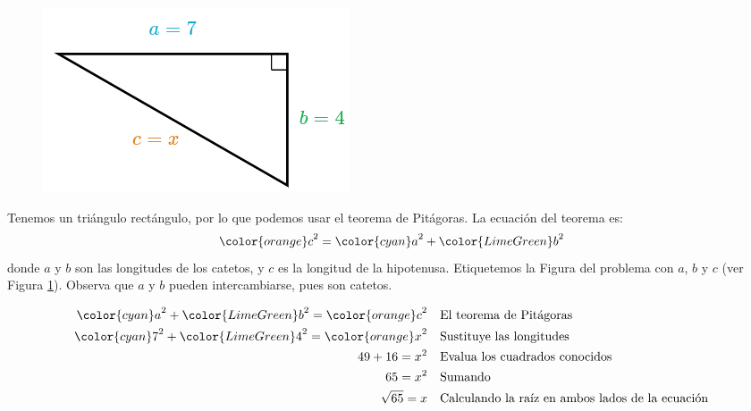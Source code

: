 \begin{minipage}[t][][t]{0.6\textwidth}
    \begin{solutionbox}{9cm}
        \begin{minipage}{0.4\textwidth}
            \begin{figure}[H]
                \centering
                \includegraphics[width=0.9\linewidth]{../images/lados_pitagoras_20a.png}
                \caption{}
                \label{fig:lados_pitagoras_20a}
            \end{figure}
        \end{minipage}\hfill
        \begin{minipage}{0.55\textwidth}
            Tenemos un triángulo rectángulo, por lo que podemos usar el teorema de Pitágoras.
            La ecuación del teorema es:
            \[{\color{orange}c}^2={\color{cyan}a}^2+{\color{LimeGreen}b}^2\]
            donde $a$ y $b$ son las longitudes de los catetos, y $c$ es la longitud de la hipotenusa.
            Etiquetemos la Figura del problema con $a$, $b$ y $c$ (ver Figura \ref{fig:lados_pitagoras_20a}).
            Observa que $a$ y $b$ pueden intercambiarse, pues son catetos.
        \end{minipage}
        \begin{align*}
            {\color{cyan}a}^2+{\color{LimeGreen}b}^2  ={\color{orange}c}^2 & \text{\quad El teorema de Pitágoras}                          \\
            {\color{cyan}7}^2+{\color{LimeGreen}4}^2  ={\color{orange}x}^2 & \text{\quad Sustituye las longitudes}                         \\
            49+16   =x^2                                                   & \text{\quad Evalua los cuadrados conocidos}                   \\
            65=x^2                                                         & \text{\quad Sumando }                                         \\
            \sqrt{65}=x                                                    & \text{\quad Calculando la raíz en ambos lados de la ecuación} \\
        \end{align*}
    \end{solutionbox}
\end{minipage}
